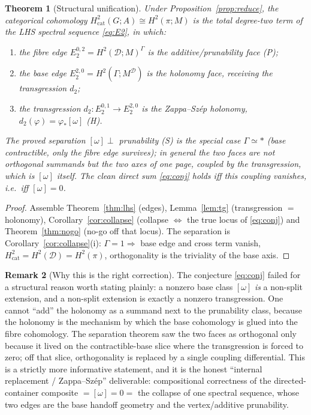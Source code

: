 \documentclass[11pt]{article}
\newtheorem{theorem}{Theorem}
\theoremstyle{definition}
\newtheorem{remark}[theorem]{Remark}
\newcommand{\D}{\mathcal{D}}
\begin{document}
\begin{theorem}[Structural unification]\label{thm:unify}
Under Proposition~\ref{prop:reduce}, the categorical cohomology
$H^2_{\mathrm{cat}}(G;A)\cong H^2(\pi;M)$ is the total degree-two term of the LHS
spectral sequence \eqref{eq:E2}, in which:
\begin{enumerate}
\item the \emph{fibre edge} $E_2^{0,2}=H^2(\D;M)^\Gamma$ is the
additive/prunability face \textup{(P)};
\item the \emph{base edge} $E_2^{2,0}=H^2(\Gamma;M^\D)$ is the holonomy face,
receiving the transgression $d_2$;
\item the \emph{transgression} $d_2\colon E_2^{0,1}\to E_2^{2,0}$ \emph{is} the
Zappa--Sz\'ep holonomy, $d_2(\varphi)=\varphi_*[\omega]$ \textup{(H)}.
\end{enumerate}
The proved separation $[\omega]\perp$ prunability \textup{(S)} is the special
case $\Gamma\simeq\ast$ \textup{(}base contractible, only the fibre edge
survives\textup{)}; in general the two faces are not orthogonal summands but the
two axes of one page, \emph{coupled} by the transgression, which is $[\omega]$
itself. The clean direct sum \eqref{eq:conj} holds iff this coupling vanishes,
i.e.\ iff $[\omega]=0$.
\end{theorem}
\begin{proof}
Assemble Theorem~\ref{thm:lhs} (edges), Lemma~\ref{lem:tg} (transgression $=$
holonomy), Corollary~\ref{cor:collapse} (collapse $\Leftrightarrow$ the true
locus of \eqref{eq:conj}) and Theorem~\ref{thm:nogo} (no-go off that locus). The
separation is Corollary~\ref{cor:collapse}(i): $\Gamma=1\Rightarrow$ base edge
and cross term vanish, $H^2_{\mathrm{cat}}=H^2(\D)=H^2(\pi)$, orthogonality is
the triviality of the base axis.
\end{proof}

\begin{remark}[Why this is the right correction]
The conjecture \eqref{eq:conj} failed for a structural reason worth stating
plainly: a nonzero base class $[\omega]$ \emph{is} a non-split extension, and a
non-split extension is exactly a nonzero transgression. One cannot ``add'' the
holonomy as a summand next to the prunability class, because the holonomy is the
mechanism by which the base cohomology is glued into the fibre cohomology.
The separation theorem saw the two faces as orthogonal only because it lived on
the contractible-base slice where the transgression is forced to zero; off that
slice, orthogonality is replaced by a single coupling differential. This is a
strictly more informative statement, and it is the honest ``internal
replacement / Zappa--Sz\'ep'' deliverable: compositional correctness of the
directed-container composite $= [\omega]=0 =$ the collapse of one spectral
sequence, whose two edges are the base handoff geometry and the vertex/additive
prunability.
\end{remark}
\end{document}
